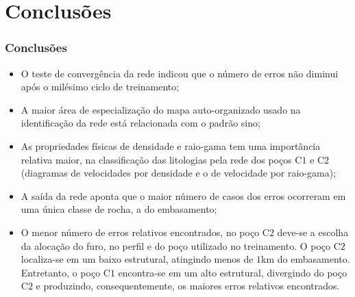 \documentclass[10pt]{beamer} %
\begin{document}

\section{Conclusões}

\begin{frame}
	\frametitle{Conclusões}
\begin{small}
	

	\begin{itemize}
		\item O teste de convergência da rede indicou que o número de erros não diminui após o milésimo ciclo de treinamento;
		\pause
		\item A maior área de especialização do mapa auto-organizado usado na identificação da rede está relacionada com o padrão sino;
		\pause
		\item As propriedades físicas de densidade e raio-gama tem uma importância relativa maior, na classificação das litologias pela rede dos poços  C$1$ e C$2$ (diagramas de velocidades por densidade e o de velocidade por raio-gama);
		\pause
		\item A saída da rede aponta que o maior número de casos dos erros ocorreram em uma única classe de rocha, a do embasamento;
		\pause
		\item O menor número de erros relativos encontrados, no poço C$2$ deve-se a escolha da alocação do furo, no perfil e do poço utilizado no treinamento. O poço C$2$ localiza-se em um baixo estrutural, atingindo menos de $1$km do embasamento. Entretanto, o poço C$1$ encontra-se em um alto estrutural, divergindo do poço C$2$ e produzindo, consequentemente, os maiores erros relativos encontrados. 
	\end{itemize}
\end{small}	
\end{frame}




\end{document}
